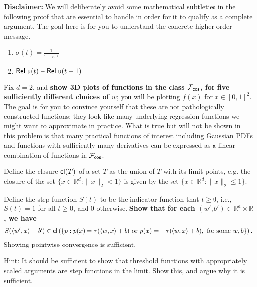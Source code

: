 {\bf Disclaimer:} We will deliberately avoid some mathematical subtleties in the following proof that are essential to handle in order for it to qualify as a complete argument. The goal here is for you to understand the concrete higher order message.

\begin{Parts}
\begin{enumerate}
\item $\sigma(t) = \frac{1}{1 + e^{-t}}$
\item ${\sf ReLu}(t) - {\sf ReLu}(t - 1)$
\end{enumerate}



\Part Fix $d = 2$, and {\bf show 3D plots of functions in the class $\mathcal{F}_{{\sf cos}}$, for five sufficiently different choices of $w$}; you will be plotting $f(x)$ for $x \in [0, 1]^2$. The goal is for you to convince yourself that these are not pathologically constructed functions; they look like many underlying regression functions we might want to approximate in practice. What is true but will not be shown in this problem is that many practical functions of interest including Gaussian PDFs and functions with sufficiently many derivatives can be expressed as a linear combination of functions in $\mathcal{F}_{{\sf cos}}$.



\Part Define the closure ${\sf cl}(T)$ of a set $T$ as the union of $T$ with its limit points, e.g. the closure of the set $\{x \in \mathbb{R}^d: \|x\|_2 < 1\}$ is given by the set $\{x \in \mathbb{R}^d: \|x\|_2 \leq 1\}$.

Define the step function $S(t)$ to be the indicator function that $t \geq 0$, i.e., $S(t) = 1$ for all $t \geq 0$, and $0$ otherwise. {\bf Show that for each $(w', b') \in \mathbb{R}^d \times \mathbb{R}$, we have}
\begin{align*}
S( \langle w', x \rangle + b') \in {\sf cl} \left( \{p: p(x) = \tau(\langle w, x \rangle + b) \text{ or } p(x) = - \tau(\langle w, x \rangle + b), \text{ for some } w, b \} \right).
\end{align*}
Showing pointwise convergence is sufficient.

Hint: It should be sufficient to show that threshold functions with appropriately scaled arguments are step functions in the limit. Show this, and argue why it is sufficient.




\end{Parts}
